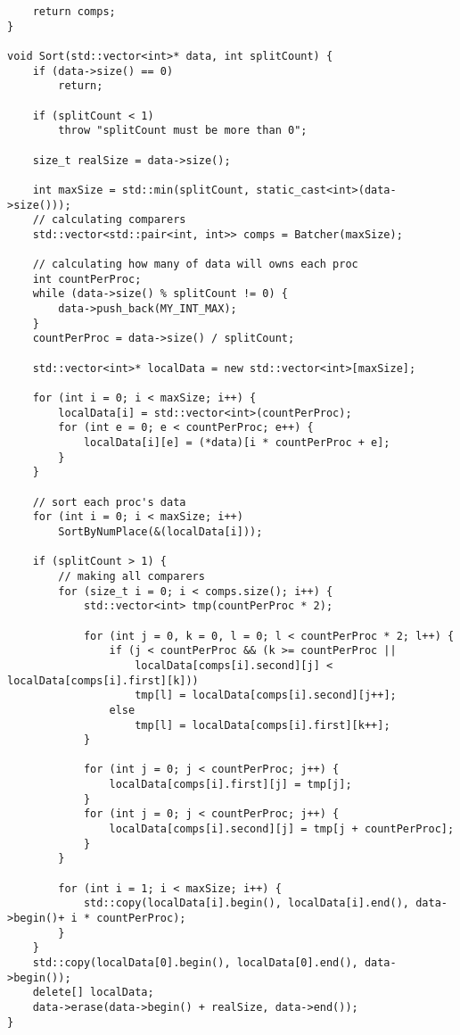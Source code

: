 \documentclass{report}
\begin{document}
\begin{lstlisting}
    return comps;
}

void Sort(std::vector<int>* data, int splitCount) {
    if (data->size() == 0)
        return;

    if (splitCount < 1)
        throw "splitCount must be more than 0";

    size_t realSize = data->size();

    int maxSize = std::min(splitCount, static_cast<int>(data->size()));
    // calculating comparers
    std::vector<std::pair<int, int>> comps = Batcher(maxSize);

    // calculating how many of data will owns each proc
    int countPerProc;
    while (data->size() % splitCount != 0) {
        data->push_back(MY_INT_MAX);
    }
    countPerProc = data->size() / splitCount;

    std::vector<int>* localData = new std::vector<int>[maxSize];

    for (int i = 0; i < maxSize; i++) {
        localData[i] = std::vector<int>(countPerProc);
        for (int e = 0; e < countPerProc; e++) {
            localData[i][e] = (*data)[i * countPerProc + e];
        }
    }

    // sort each proc's data
    for (int i = 0; i < maxSize; i++)
        SortByNumPlace(&(localData[i]));

    if (splitCount > 1) {
        // making all comparers
        for (size_t i = 0; i < comps.size(); i++) {
            std::vector<int> tmp(countPerProc * 2);

            for (int j = 0, k = 0, l = 0; l < countPerProc * 2; l++) {
                if (j < countPerProc && (k >= countPerProc ||
                    localData[comps[i].second][j] < localData[comps[i].first][k]))
                    tmp[l] = localData[comps[i].second][j++];
                else
                    tmp[l] = localData[comps[i].first][k++];
            }

            for (int j = 0; j < countPerProc; j++) {
                localData[comps[i].first][j] = tmp[j];
            }
            for (int j = 0; j < countPerProc; j++) {
                localData[comps[i].second][j] = tmp[j + countPerProc];
            }
        }

        for (int i = 1; i < maxSize; i++) {
            std::copy(localData[i].begin(), localData[i].end(), data->begin()+ i * countPerProc);
        }
    }
    std::copy(localData[0].begin(), localData[0].end(), data->begin());
    delete[] localData;
    data->erase(data->begin() + realSize, data->end());
}

\end{lstlisting}
\end{document}
